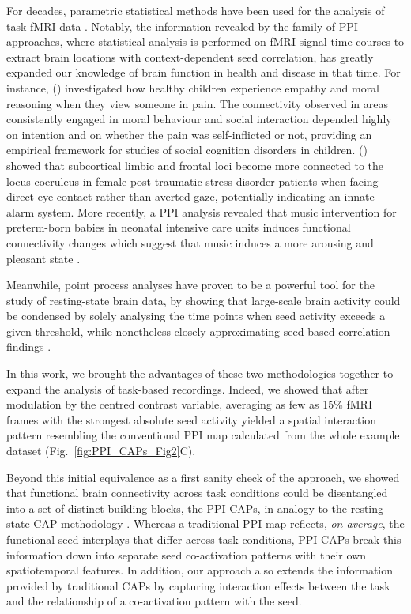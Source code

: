 For decades, parametric statistical methods have  been used for the analysis of task fMRI data \citep{Friston1994,Eklund2016}. Notably, the information revealed by the family of PPI approaches, where statistical analysis is performed on fMRI signal time courses to extract brain locations with context-dependent seed correlation, has greatly expanded our knowledge of brain function in health and disease in that time. For instance, \citeauthor{Decety2008} (\citeyear{Decety2008}) investigated how healthy children experience empathy and moral reasoning when they view someone in pain. The connectivity observed in areas consistently engaged in moral behaviour and social interaction depended highly on intention and on whether the pain was self-inflicted or not, providing an empirical framework for studies of social cognition disorders in children. \citeauthor{Steuwe2015} (\citeyear{Steuwe2015}) showed that subcortical limbic and frontal loci become more connected to the locus coeruleus in female post-traumatic stress disorder patients when facing direct eye contact rather than averted gaze, potentially indicating an innate alarm system. More recently, a PPI analysis revealed that music intervention for preterm-born babies in neonatal intensive care units induces functional connectivity changes which suggest that music induces a more arousing and pleasant state \citep{Lordier2018}.

 
Meanwhile, point process analyses \citep{Tagliazucchi2012} have  proven to be a powerful tool for the study of resting-state brain data, by showing that large-scale brain activity could be condensed by solely analysing the time points when seed activity exceeds a given threshold, while nonetheless closely approximating seed-based correlation findings \citep{Liu2013a}.

In this work, we brought   the advantages of these two methodologies together to expand the analysis of task-based recordings. Indeed, we showed that after modulation by the centred  contrast variable, averaging as few as 15\% fMRI frames with the strongest absolute seed activity yielded a spatial interaction pattern resembling the conventional PPI map calculated from the whole example dataset (Fig.~\ref{fig:PPI_CAPs_Fig2}C). 

Beyond this initial equivalence as a first sanity check of the approach, we showed that functional brain connectivity across task conditions could be disentangled into a set of distinct building blocks, the PPI-CAPs, in analogy to the resting-state CAP methodology \citep{Liu2013,Liu2018}. Whereas a traditional PPI map reflects, \textit{on average}, the functional seed interplays that differ across task conditions, PPI-CAPs break this information down into separate seed co-activation patterns with their own spatiotemporal features. In addition, our approach also extends the information provided by traditional CAPs by capturing interaction effects between the task and the relationship of a co-activation pattern with the seed.

